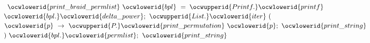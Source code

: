 \documentclass[12pt]{article}
\begin{document}
\ocweol
\label{Canonical.ml:7691}%
\medskip
\ocwbegincode{}\ocwindent{0.00em}
~$\ocwlowerid{print\_braid\_permlist}~\ocwlowerid{bpl}~=$\ocweol
\ocwindent{1.00em}
$\ocwupperid{Printf.}\ocwlowerid{printf}~$~$\ocwlowerid{bpl.}\ocwlowerid{delta\_power};$\ocweol
\ocwindent{1.00em}
$\ocwupperid{List.}\ocwlowerid{iter}~($~$\ocwlowerid{p}~\rightarrow{}~\ocwupperid{P.}\ocwlowerid{print\_permutation}~\ocwlowerid{p};~\ocwlowerid{print\_string}~$$)~\ocwlowerid{bpl.}\ocwlowerid{permlist};$\ocweol
\ocwindent{1.00em}
$\ocwlowerid{print\_string}~$\ocweol
\ocwendcode{}
\end{document}
